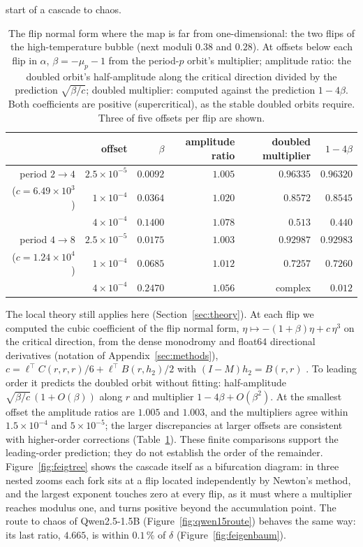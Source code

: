 \documentclass[11pt,letterpaper]{article}
\begin{document}
start of a cascade to chaos.
\begin{table}[H]
\centering\small
\begin{tabular}{rrrrrr}
\toprule
 & offset & $\beta$ & amplitude ratio & doubled multiplier & $1-4\beta$ \\
\midrule
period $2\to4$ & $2.5\times10^{-5}$ & $0.0092$ & $1.005$ & $0.96335$ & $0.96320$ \\
($c=6.49\times10^{3}$) & $1\times10^{-4}$ & $0.0364$ & $1.020$ & $0.8572$ & $0.8545$ \\
 & $4\times10^{-4}$ & $0.1400$ & $1.078$ & $0.513$ & $0.440$ \\
\midrule
period $4\to8$ & $2.5\times10^{-5}$ & $0.0175$ & $1.003$ & $0.92987$ & $0.92983$ \\
($c=1.24\times10^{4}$) & $1\times10^{-4}$ & $0.0685$ & $1.012$ & $0.7257$ & $0.7260$ \\
 & $4\times10^{-4}$ & $0.2470$ & $1.056$ & complex & $0.012$ \\
\bottomrule
\end{tabular}
\caption{The flip normal form where the map is far from one-dimensional: the two flips of the high-temperature bubble
(next moduli $0.38$ and $0.28$). At offsets below each flip in $\alpha$, $\beta=-\mu_p-1$ from the period-$p$ orbit's
multiplier; amplitude ratio: the doubled orbit's half-amplitude along the critical direction divided by the
prediction $\sqrt{\beta/c}$; doubled multiplier: computed against the prediction $1-4\beta$. Both coefficients are
positive (supercritical), as the stable doubled orbits require. Three of five offsets per flip are shown.}
\label{tab:flipnf}
\end{table}
The local theory still applies here (Section~\ref{sec:theory}). At each flip we computed the cubic coefficient of the
flip normal form, $\eta\mapsto-(1+\beta)\eta+c\,\eta^3$ on the critical direction, from the dense monodromy and
float64 directional derivatives (notation of Appendix~\ref{sec:methods}), $c=\ell^\top C(r,r,r)/6+\ell^\top B(r,h_2)/2$ with $(I-M)h_2=B(r,r)$
\cite{kuznetsov2023elements}. To leading order it predicts the doubled orbit without fitting: half-amplitude
$\sqrt{\beta/c}\,(1+O(\beta))$ along $r$ and multiplier $1-4\beta+O(\beta^2)$. At the smallest offset the amplitude ratios are $1.005$ and $1.003$, and the multipliers agree
within $1.5\times10^{-4}$ and $5\times10^{-5}$; the larger discrepancies at larger offsets are consistent with
higher-order corrections (Table~\ref{tab:flipnf}). These finite comparisons support the leading-order prediction; they
do not establish the order of the remainder. Figure~\ref{fig:feigtree} shows the cascade itself as a bifurcation diagram: in three nested zooms each fork sits at a flip located independently by Newton's method, and the largest exponent touches zero at every flip, as it must where a multiplier reaches modulus one, and turns
positive beyond the accumulation point. The route to chaos of Qwen2.5-1.5B (Figure~\ref{fig:qwen15route}) behaves the same way: its last ratio, $4.665$, is within $0.1\,\%$ of $\delta$ (Figure~\ref{fig:feigenbaum}).
\end{document}
